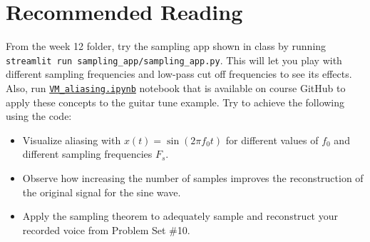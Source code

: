 \section{Recommended Reading}
From the week 12 folder, try the sampling app shown in class by running \texttt{streamlit run sampling\_app/sampling\_app.py}. This will let you play with different sampling frequencies and low-pass cut off frequencies to see its effects. Also, run \href{https://github.com/ee-ucmerced/ee102-signals-systems/blob/main/lecture_notes/week12_sampling/VM_aliasing.ipynb}{\texttt{VM\_aliasing.ipynb}} notebook that is available on course GitHub to apply these concepts to the guitar tune example. Try to achieve the following using the code:
\begin{itemize}
    \item Visualize aliasing with $x(t) = \sin(2\pi f_0 t)$ for different values of $f_0$ and different sampling frequencies $F_s$.
    \item Observe how increasing the number of samples improves the reconstruction of the original signal for the sine wave.
    \item Apply the sampling theorem to adequately sample and reconstruct your recorded voice from Problem Set \#10.
\end{itemize}
